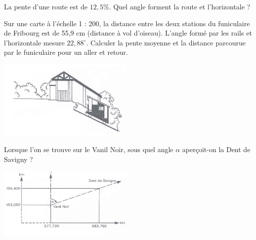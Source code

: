 \begin{exercice}
La pente d’une route est de $12,5 \%$. Quel angle forment la route et l’horizontale ?
\end{exercice}

\begin{exercice}
Sur une carte à l’échelle 1 : 200, la distance entre les deux stations du funiculaire de Fribourg est de 55,9 cm (distance à vol d'oiseau). L’angle formé par les rails et l’horizontale mesure $22,88^\circ$. Calculer la pente moyenne et la distance parcourue par le funiculaire pour un aller et retour.
\begin{center}
\includegraphics[width = 0.5\textwidth]{trigo/image/trigo13.png}
\end{center}
\end{exercice}

\begin{exercice}
Lorsque l’on se trouve sur le Vanil Noir, sous quel angle $\alpha $ aperçoit-on la Dent de Savigny ?
\begin{center}
\includegraphics[width = 0.5\textwidth]{trigo/image/trigo14.png}
\end{center}
\end{exercice}

